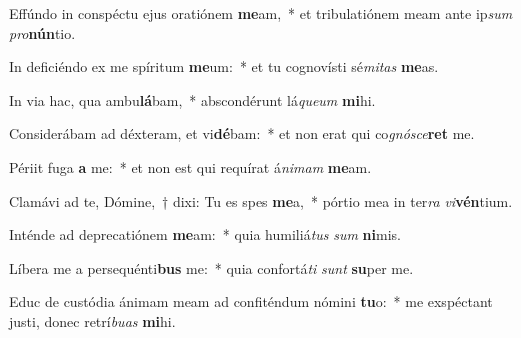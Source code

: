\item Effúndo in conspéctu ejus oratiónem \textbf{me}am,~* et tribulatiónem meam ante ip\textit{sum} \textit{pro}\textbf{nún}tio.
\item In deficiéndo ex me spíritum \textbf{me}um:~* et tu cognovísti sé\textit{mi}\textit{tas} \textbf{me}as.
\item In via hac, qua ambu\textbf{lá}bam,~* abscondérunt lá\textit{que}\textit{um} \textbf{mi}hi.
\item Considerábam ad déxteram, et vi\textbf{dé}bam:~* et non erat qui co\textit{gnó}\textit{sce}\textbf{ret} me.
\item Périit fuga \textbf{a} me:~* et non est qui requírat á\textit{ni}\textit{mam} \textbf{me}am.
\item Clamávi ad te, Dómine,~† dixi: Tu es spes \textbf{me}a,~* pórtio mea in ter\textit{ra} \textit{vi}\textbf{vén}tium.
\item Inténde ad deprecatiónem \textbf{me}am:~* quia humiliá\textit{tus} \textit{sum} \textbf{ni}mis.
\item Líbera me a persequénti\textbf{bus} me:~* quia confortá\textit{ti} \textit{sunt} \textbf{su}per me.
\item Educ de custódia ánimam meam ad confiténdum nómini \textbf{tu}o:~* me exspéctant justi, donec retrí\textit{bu}\textit{as} \textbf{mi}hi.

